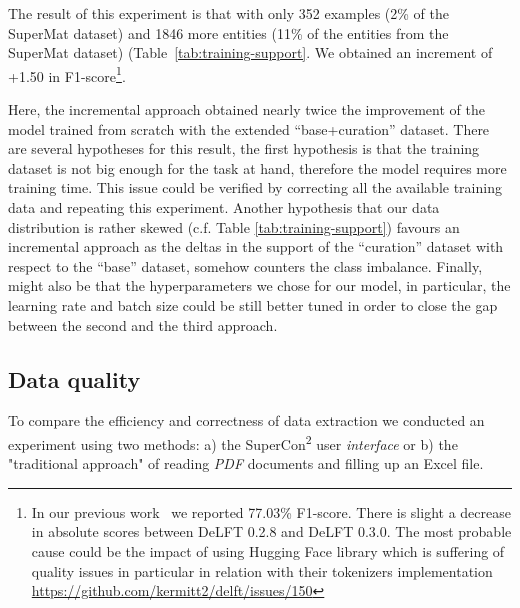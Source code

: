 \documentclass[a4paper]{article}
\begin{document}
The result of this experiment is that with only 352 examples (2\% of the SuperMat dataset) and 1846 more entities (11\% of the entities from the SuperMat dataset) (Table~\ref{tab:training-support}. 
We obtained an increment of +1.50 in F1-score\footnote{In our previous work~\cite{lfoppiano2023automatic} we reported 77.03\% F1-score. There is slight a decrease in absolute scores between DeLFT 0.2.8 and DeLFT 0.3.0. The most probable cause could be the impact of using Hugging Face library which is suffering of quality issues in particular in relation with their tokenizers implementation \url{https://github.com/kermitt2/delft/issues/150}}.



Here, the incremental approach obtained nearly twice the improvement of the model trained from scratch with the extended ``base+curation'' dataset. 
There are several hypotheses for this result, the first hypothesis is that the training dataset is not big enough for the task at hand, therefore the model requires more training time. 
This issue could be verified by correcting all the available training data and repeating this experiment. 
Another hypothesis that our data distribution is rather skewed (c.f. Table \ref{tab:training-support}) favours an incremental approach as the deltas in the support of the ``curation'' dataset with respect to the ``base'' dataset, somehow counters the class imbalance. 
Finally, might also be that the hyperparameters we chose for our model, in particular, the learning rate and batch size could be still better tuned in order to close the gap between the second and the third approach.


\subsection{Data quality}
\label{sec:interface-evaluation}
To compare the efficiency and correctness of data extraction we conducted an experiment using two methods: a) the SuperCon\textsuperscript{2} user \textit{interface} or b) the "traditional approach" of reading \textit{PDF} documents and filling up an Excel file. 
\end{document}
